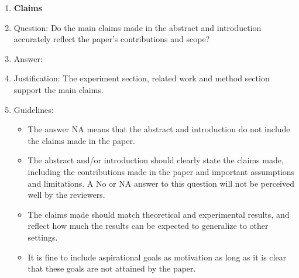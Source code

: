 \documentclass{article}
\begin{document}
\begin{enumerate}

\item {\bf Claims}
    \item[] Question: Do the main claims made in the abstract and introduction accurately reflect the paper's contributions and scope?
    \item[] Answer: \answerYes{} %
    \item[] Justification: The experiment section, related work and method section support the main claims.
    \item[] Guidelines:
    \begin{itemize}
        \item The answer NA means that the abstract and introduction do not include the claims made in the paper.
        \item The abstract and/or introduction should clearly state the claims made, including the contributions made in the paper and important assumptions and limitations. A No or NA answer to this question will not be perceived well by the reviewers. 
        \item The claims made should match theoretical and experimental results, and reflect how much the results can be expected to generalize to other settings. 
        \item It is fine to include aspirational goals as motivation as long as it is clear that these goals are not attained by the paper. 
    \end{itemize}


\end{enumerate}
\end{document}
